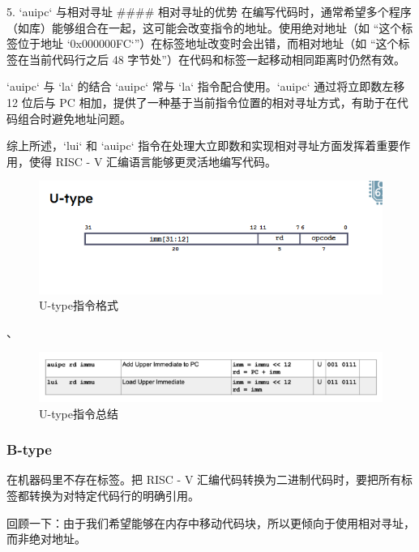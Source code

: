 \documentclass{ctexart}
\begin{document}
 5. `auipc` 与相对寻址
#### 相对寻址的优势
在编写代码时，通常希望多个程序（如库）能够组合在一起，这可能会改变指令的地址。使用绝对地址（如 “这个标签位于地址 `0x000000FC`”）在标签地址改变时会出错，而相对地址（如 “这个标签在当前代码行之后 48 字节处”）在代码和标签一起移动相同距离时仍然有效。

`auipc` 与 `la` 的结合
`auipc` 常与 `la` 指令配合使用。`auipc` 通过将立即数左移 12 位后与 PC 相加，提供了一种基于当前指令位置的相对寻址方式，有助于在代码组合时避免地址问题。

综上所述，`lui` 和 `auipc` 指令在处理大立即数和实现相对寻址方面发挥着重要作用，使得 RISC - V 汇编语言能够更灵活地编写代码。 
\begin{figure}
    \centering
    \includegraphics[width=0.5\linewidth]{U-type指令格式.png}
    \caption{U-type指令格式}
    \label{fig:enter-label}
\end{figure}、
\begin{figure}
        \centering
        \includegraphics[width=0.5\linewidth]{U-type指令总结.png}
        \caption{U-type指令总结}
        \label{fig:enter-label}
    \end{figure}
    \subsubsection{B-type}
    在机器码里不存在标签。把 RISC - V 汇编代码转换为二进制代码时，要把所有标签都转换为对特定代码行的明确引用。\par

回顾一下：由于我们希望能够在内存中移动代码块，所以更倾向于使用相对寻址，而非绝对地址。\par
\end{document}
